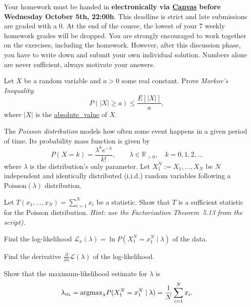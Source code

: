 \documentclass[a4paper,10pt,landscape,twocolumn]{scrartcl}
\newcommand\deadline{Wednesday October 5th, 22:00h}
\begin{document}
\homeworkproblems

{\sffamily\noindent
  Your homework must be handed in \textbf{electronically via
  \href{\canvasURL}{Canvas} before \deadline}. This deadline is strict and late
  submissions are graded with a 0. At the end of the course, the lowest of your
  7 weekly homework grades will be dropped. You are strongly encouraged to work
  together on the exercises, including the homework. However, after this
  discussion phase, you have to write down and submit your own individual
  solution. Numbers alone are never sufficient, always motivate your answers.
}


\begin{exercise}
  Let $X$ be a random variable and $a > 0$ some real constant. Prove 
  \emph{Markov's Inequality}:
  \[
    P(|X| \ge a) \le \frac{E[|X|]}{a},
  \]
  where $|X|$ is the
  \href{https://en.wikipedia.org/wiki/Absolute\_value}{absolute\_value} of $X$.

\end{exercise}


\begin{exercise}
  The \emph{Poisson distribution} models how often some event happens in a
  given period of time. Its probability mass function is given by
  \[
    P(X = k) 
      = {\frac {\lambda ^{k}e^{-\lambda }}{k!}}, 
      \qquad \lambda \in \mathbb{R}_{>0}, 
      \quad k=0,1,2,\dots
  \]
  where $\lambda$ is the distribution's only parameter. Let $X_1^N := X_1,
  \dots, X_N$ be $N$ independent and identically distributed (i.i.d.) random
  variables following a $\text{Poisson}(\lambda)$ distribution.
  
  \begin{subex}[1pt]
    Let $T(x_1, \dots, x_N) = \sum_{i=1}^N x_i$ be a statistic. Show that $T$
    is a sufficient statistic for the Poisson distribution. \emph{Hint: use the
    Factorization Theorem~5.13 from the script).}
  \end{subex}
  
  \begin{subex}[1pt]
    Find the log-likelihood $\mathcal L_x(\lambda) = \ln P(X_1^N = x_1^N\mid
    \lambda)$ of the data.
  \end{subex}
  
  \begin{subex}[0.5pt]
    Find the derivative $\frac{\partial}{\partial \lambda} \mathcal L(\lambda)$
    of the log-likelihood.
  \end{subex}
  
  \begin{subex}[1pt]
    Show that the maximum-likelihood estimate for $\lambda$ is
    \[
      \lambda_\textsc{ml} 
        = \text{argmax}_\lambda P(X_1^N = x_1^N \mid \lambda) 
        = \frac{1}{N}\sum_{i=1}^N x_i.
    \]
  \end{subex}	
\end{exercise}
\end{document}
